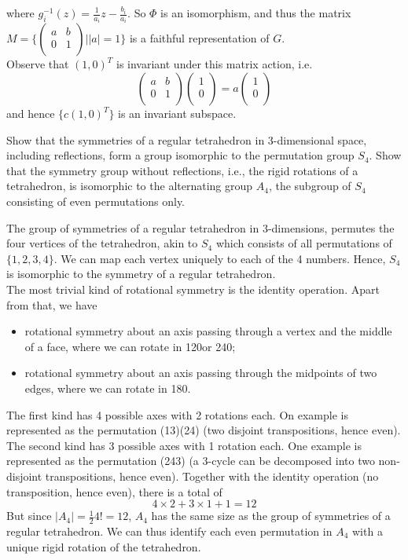 \documentclass[a4paper]{article}
\begin{document}
\begin{ans}
where $g_i^{-1}(z)=\frac{1}{a_i}z-\frac{b_i}{a_i}$. 
So $\Phi$ is an isomorphism, and thus the matrix  $M=\{\begin{pmatrix}a&b\\0&1\\\end{pmatrix}||a|=1\}$ is a faithful representation of $G$.\\[5pt]
Observe that $(1,0)^T$ is invariant under this matrix action, i.e.
$$\begin{pmatrix}a&b\\0&1\\\end{pmatrix}\begin{pmatrix}1\\0\\\end{pmatrix}=a\begin{pmatrix}1\\0\\\end{pmatrix}$$
and hence $\{c(1,0)^T\}$ is an invariant subspace.
\end{ans}
\newpage
\begin{qns}
Show that the symmetries of a regular tetrahedron in 3-dimensional space, including reflections, form a group isomorphic to the permutation group $S_4$. Show that the symmetry group without reflections, i.e., the rigid rotations of a tetrahedron, is isomorphic to the alternating group $A_4$, the subgroup of $S_4$ consisting of even permutations only.
\end{qns}
\begin{ans}
The group of symmetries of a regular tetrahedron in 3-dimensions, permutes the four vertices of the tetrahedron, akin to $S_4$ which consists of all permutations of $\{1,2,3,4\}$. We can map each vertex uniquely to each of the 4 numbers. Hence, $S_4$ is isomorphic to the symmetry of a regular tetrahedron.\\[5pt]
The most trivial kind of rotational symmetry is the identity operation. Apart from that, we have 
\begin{itemize}
    \item rotational symmetry about an axis passing through a vertex and the middle of a face, where we can rotate in 120\degree or 240\degree;
    \item rotational symmetry about an axis passing through the midpoints of two edges, where we can rotate in 180\degree.
\end{itemize}
The first kind has 4 possible axes with 2 rotations each. On example is represented as the permutation (13)(24) (two disjoint transpositions, hence even). The second kind has 3 possible axes with 1 rotation each. One example is represented as the permutation (243) (a 3-cycle can be decomposed into two non-disjoint transpositions, hence even). Together with the identity operation (no transposition, hence even), there is a total of
$$4\times 2+3\times 1+1=12$$
But since $|A_4|=\frac{1}{2}4!=12$, $A_4$ has the same size as the group of symmetries of a regular tetrahedron. We can thus identify each even permutation in $A_4$ with a unique rigid rotation of the tetrahedron.
\end{ans}
\end{document}
